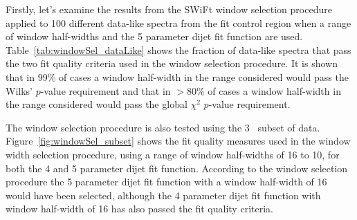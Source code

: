 Firstly, let's examine the results from the SWiFt window selection procedure applied to 100 different data-like spectra from the fit control region
when a range of window half-widths and the 5 parameter dijet fit function are used.
Table~\ref{tab:windowSel_dataLike} shows the fraction of data-like spectra that pass the two fit quality criteria used in the window selection procedure.
It is shown that in $99\%$ of cases a window half-width in the range considered would pass the Wilks' \mbox{$p$-value} requirement
and that in $>80\%$ of cases a window half-width in the range considered would pass the global $\chi^{2}$ \mbox{$p$-value} requirement.

The window selection procedure is also tested using the 3~\ifb{} subset of data.
Figure~\ref{fig:windowSel_subset} shows the fit quality measures used in the window width selection procedure,
using a range of window half-widths of 16 to 10, for both the 4 and 5 parameter dijet fit function.
According to the window selection procedure the 5 parameter dijet fit function with a window half-width of 16 would have been selected,
although the 4 parameter dijet fit function with window half-width of 16 has also passed the fit quality criteria.

